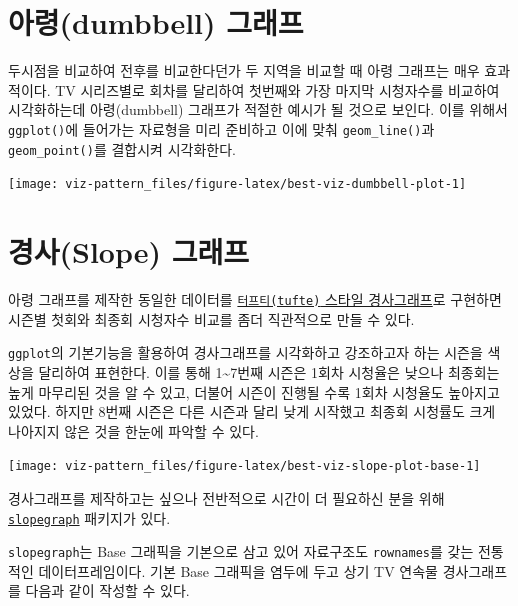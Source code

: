 \documentclass[
]{book}
\begin{document}
\hypertarget{gghighlight-dumbbel-plot}{%
\section{아령(dumbbell) 그래프}\label{gghighlight-dumbbel-plot}}

두시점을 비교하여 전후를 비교한다던가 두 지역을 비교할 때 아령 그래프는 매우 효과적이다.
TV 시리즈별로 회차를 달리하여 첫번째와 가장 마지막 시청자수를 비교하여 시각화하는데 아령(dumbbell) 그래프가 적절한 예시가 될 것으로 보인다. 이를 위해서 \texttt{ggplot()}에 들어가는 자료형을 미리 준비하고 이에 맞춰 \texttt{geom\_line()}과 \texttt{geom\_point()}를 결합시켜 시각화한다.

\begin{center}\texttt{[image: viz-pattern\_files/figure-latex/best-viz-dumbbell-plot-1]} \end{center}

\hypertarget{gghighlight-slope-plot}{%
\section{경사(Slope) 그래프}\label{gghighlight-slope-plot}}

아령 그래프를 제작한 동일한 데이터를 \href{https://www.edwardtufte.com/bboard/q-and-a-fetch-msg?msg_id=0003nk}{\texttt{터프티(tufte)} 스타일 경사그래프}로 구현하면
시즌별 첫회와 최종회 시청자수 비교를 좀더 직관적으로 만들 수 있다.

\texttt{ggplot}의 기본기능을 활용하여 경사그래프를 시각화하고 강조하고자 하는 시즌을
색상을 달리하여 표현한다. 이를 통해 1\textasciitilde7번째 시즌은 1회차 시청율은 낮으나 최종회는 높게
마무리된 것을 알 수 있고, 더불어 시즌이 진행될 수록 1회차 시청율도 높아지고 있었다.
하지만 8번째 시즌은 다른 시즌과 달리 낮게 시작했고 최종회 시청률도 크게 나아지지 않은 것을
한눈에 파악할 수 있다.

\begin{center}\texttt{[image: viz-pattern\_files/figure-latex/best-viz-slope-plot-base-1]} \end{center}

경사그래프를 제작하고는 싶으나 전반적으로 시간이 더 필요하신 분을 위해
\href{https://github.com/leeper/slopegraph}{\texttt{slopegraph}} 패키지가 있다.

\texttt{slopegraph}는 Base 그래픽을 기본으로 삼고 있어 자료구조도 \texttt{rownames}를 갖는 전통적인 데이터프레임이다.
기본 Base 그래픽을 염두에 두고 상기 TV 연속물 경사그래프를 다음과 같이 작성할 수 있다.
\end{document}
